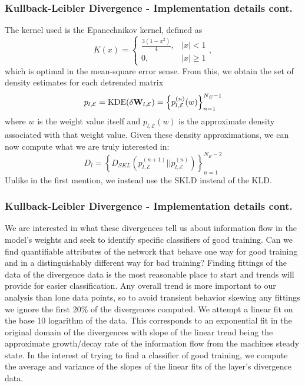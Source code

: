 \documentclass[11pt,aspectratio=169]{beamer}
\newcommand{\abs}[1]{\left|#1\right|}
\newcommand{\parens}[1]{\left(#1\right)}
\newcommand{\bracks}[1]{\left\{#1\right\}}
\begin{document}
    \begin{frame}
        \frametitle{Kullback-Leibler Divergence - Implementation details cont.}
        The kernel used is the Epanechnikov kernel, defined as 
        \begin{equation}
            K(x) = 
            \begin{cases}
                \frac{3(1-x^2)}{4}, & \abs{x} < 1 \\
                0, & \abs{x} \geq 1
            \end{cases},\label{eqn:epanechnikov}
        \end{equation}
        which is optimal in the mean-square error sense. From this, we obtain the set of density estimates for each detrended 
        matrix
        \begin{equation}
            p_{l,\mathcal{E}} = \text{KDE}(\delta{\bf W}_{l, \mathcal{E}}) = \bracks{p_{l,\mathcal{E}}^{(n)}(w)}_{n=1}^{N_E-1}
        \end{equation}
        where $w$ is the weight value itself and $p_{l,\mathcal{E}}(w)$ is the approximate density associated 
        with that weight value. Given these density approximations, we 
        can now compute what we are truly interested in:
        \begin{equation}
            D_l = \bracks{D_{SKL}\parens{p_{l,\mathcal{E}}^{(n+1)} \Big|\!\Big| p_{l,\mathcal{E}}^{(n)}}}_{n=1}^{N_E-2}
        \end{equation}
        Unlike in the first mention, we instead use the SKLD instead of the KLD.
    \end{frame}

    \begin{frame}
        \frametitle{Kullback-Leibler Divergence - Implementation details cont.}
        We are interested in what these divergences tell us about information flow in the model's weights and 
        seek to identify specific classifiers of good training. 
        Can we find quantifiable attributes of the network that behave one way for good training and in a 
        distinguishably different way for bad training? Finding fittings of the data of the divergence data
        is the most reasonable place to start and trends will provide for easier classification. Any overall trend
        is more important to our analysis than lone data points, so to avoid transient behavior skewing any fittings
        we ignore the first 20\% of the divergences computed. We attempt a linear fit on the base 10 logarithm of the data. This 
        corresponds to an exponential fit in the original domain of the divergences with slope of the linear trend 
        being the approximate growth/decay rate of the information flow from the machines steady state. 
        In the interest of trying to find a 
        classifier of good training, we compute the average and variance of the slopes of the linear fits of 
        the layer's divergence data.
    \end{frame}
\end{document}

